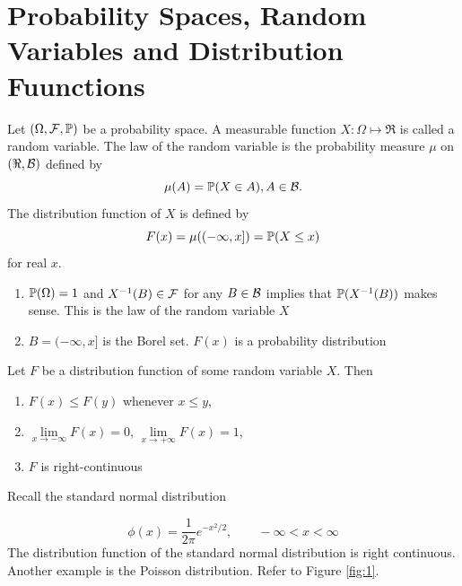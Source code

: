 \chapter{Probability Spaces, Random Variables and Distribution Fuunctions}

\begin{definition}
Let $(\Omega, \mathcal F, \mathbb P)$ be a probability space.  A measurable function $X: \Omega\mapsto \Re$ is called a random variable. The law of the random variable is the probability measure $\mu$ on $(\Re, \mathcal B )$ defined by
\begin{equation}
\mu(A)=\mathbb P(X\in A), A\in\mathcal B.
\end{equation}
The distribution function of $X$ is defined by
\begin{equation}
F(x)=\mu((-\infty, x])=\mathbb P(X\leq x)
\end{equation}
for real $x$.
\end{definition}


\begin{notes}
\begin{enumerate}
\item $\mathbb P(\Omega)=1$ and $X^{-1}(B)\in \mathcal F$ for any $B\in\mathcal B$ implies that $\mathbb P(X^{-1}(B))$ makes sense. This is the law of the random variable $X$
\item $B=(-\infty, x]$ is the Borel set. $F(x)$ is a probability distribution
\end{enumerate}
\end{notes}



\begin{theorem}\label{thm:prob:1}
Let $F$  be a distribution function of some random variable $X$. Then
\begin{enumerate}
\item $F(x)\leq F(y)$ whenever $x\leq y$,
\item $\lim\limits_{x\to -\infty} F(x)=0$, $\lim\limits_{x\to+\infty}F(x)=1$,
\item $F$ is right-continuous
\end{enumerate}
\end{theorem}


Recall the standard normal distribution

\begin{equation*}
\phi(x) = \frac{1}{2\pi}e^{-x^2/2}, \qquad -\infty <x < \infty
\end{equation*}
The distribution function of the standard normal distribution is right continuous. Another example is the Poisson distribution. Refer to Figure \ref{fig:1}.


